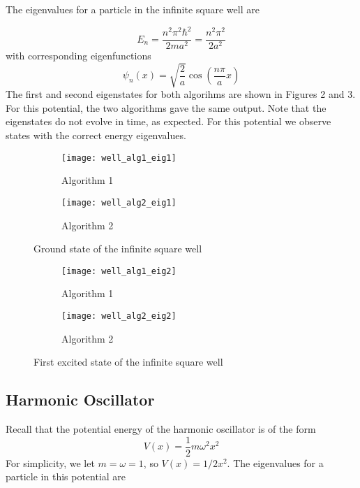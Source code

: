 \documentclass{article}
\begin{document}
The eigenvalues for a particle in the infinite square well are

\begin{equation}
E_n = \frac{n^2 \pi^2 \hbar^2}{2 ma^2} = \frac{n^2 \pi ^2}{2 a^2}
\end{equation}
%
with corresponding eigenfunctions
\begin{equation}
\psi_n(x) = \sqrt{\frac{2}{a}} \cos \left( \frac{n\pi}{a} x \right)
\end{equation}
%
The first and second eigenstates for both algorihms are shown in Figures 2 and 3. For this potential, the two algorithms gave the same output. Note that the eigenstates do not evolve in time, as expected. For this potential we observe states with the correct energy eigenvalues.


\begin{figure}
\centering
\begin{subfigure}[h!]{0.3\textwidth}
\centering
\texttt{[image: well\_alg1\_eig1]}
\caption{Algorithm 1}
\end{subfigure}
%
\begin{subfigure}[h!]{0.3\textwidth}
\centering
\texttt{[image: well\_alg2\_eig1]}
\caption{Algorithm 2}
\end{subfigure}

\caption{Ground state of the infinite square well}
\end{figure}

\begin{figure}
\centering
\begin{subfigure}[h!]{0.3\textwidth}
\centering
\texttt{[image: well\_alg1\_eig2]}
\caption{Algorithm 1}
\end{subfigure}
%
\begin{subfigure}[h!]{0.3\textwidth}
\centering
\texttt{[image: well\_alg2\_eig2]}
\caption{Algorithm 2}
\end{subfigure}

\caption{First excited state of the infinite square well}
\end{figure}
%
\subsection{Harmonic Oscillator}

Recall that the potential energy of the harmonic oscillator is of the form
\begin{equation}
V(x) = \frac{1}{2}m\omega^2x^2
\end{equation}
%
For simplicity, we let $m = \omega = 1$, so $V(x) = 1/2x^2$. The eigenvalues for a particle in this potential are
\end{document}
